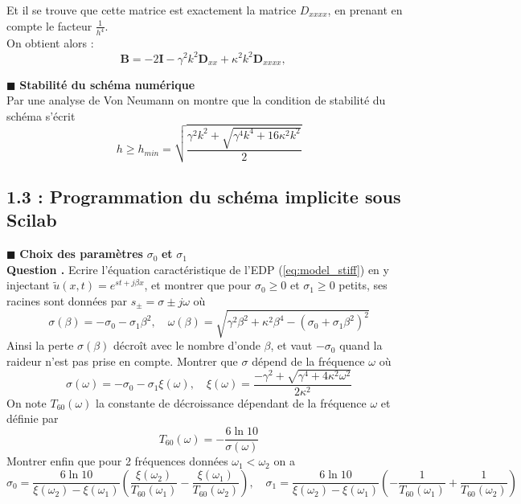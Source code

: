 \documentclass[a4,12pt]{article}
\newcommand{\B}{\mathbf{B}}
\newcommand{\D}{\mathbf{D}}
\newcounter{Nbquestion}
\newcommand*\question{%
\stepcounter{Nbquestion}%
\textbf{Question \theNbquestion. }}
\begin{document}
    Et il se trouve que cette matrice est exactement la matrice $D_{xxxx}$, en prenant en compte le facteur $\frac{1}{h^4}$.\\

  On obtient alors :
  $$ \B=-2\mathbf{I}-\gamma^2 k^2 \D_{xx}+\kappa^2 k^2\D_{xxxx}, \quad $$


  \hspace{0.5cm} $\blacksquare$ \textbf{Stabilité du schéma numérique} \\

  Par une analyse de Von Neumann on montre que la condition de stabilité du schéma s'écrit 
  \[
    h\geqslant h_{min}=\sqrt{\frac{\gamma^2k^2+\sqrt{\gamma^4 k^4+16\kappa^2 k^2}}{2}}
  \]

  \subsection*{1.3 : Programmation du schéma implicite sous Scilab}

  \hspace{0.5cm} $\blacksquare$ \textbf{Choix des paramètres} $\sigma_0$  \textbf{et}  $\sigma_1$\\


  \question Ecrire l'équation caractéristique de l'EDP (\ref{eq:model_stiff}) en y injectant $\tilde u(x,t)=e^{st+j\beta x}$, et montrer que pour $\sigma_0\geqslant 0$ et $\sigma_1\geqslant 0$ petits, ses racines sont données par $s_{\pm}=\sigma\pm j\omega$ où 
  \[
    \sigma(\beta)=-\sigma_0-\sigma_1\beta^2,\quad \omega(\beta)=\sqrt{\gamma^2 \beta^2+\kappa^2\beta^4-(\sigma_0+\sigma_1\beta^2)^2}
  \]
  Ainsi la perte $\sigma(\beta)$ décroît avec le nombre d'onde $\beta$, et vaut $-\sigma_0$ quand la raideur n'est pas prise en compte.  Montrer que $\sigma$ dépend de la fréquence $\omega$ où 
  \[
    \sigma(\omega)=-\sigma_0-\sigma_1\xi (\omega),\quad \xi(\omega)=\frac{-\gamma^2+\sqrt{\gamma^4+4\kappa^2 \omega^2}}{2\kappa^2}
  \]
  On note $T_{60}(\omega)$ la constante de décroissance dépendant de la fréquence $\omega$ et définie par 
  \[
    T_{60}(\omega)=-\frac{6\ln 10}{\sigma(\omega)}
  \]
  Montrer enfin que pour 2 fréquences données $\omega_1<\omega_2$ on a 
  \[
    \sigma_0=\frac{6 \ln 10}{\xi(\omega_2)-\xi(\omega_1)}\left(\frac{\xi(\omega_2)}{T_{60}(\omega_1)}-\frac{\xi(\omega_1)}{T_{60}(\omega_2)}\right), \quad \sigma_1=\frac{6 \ln 10}{\xi(\omega_2)-\xi(\omega_1)}\left(-\frac{1}{T_{60}(\omega_1)}+\frac{1}{T_{60}(\omega_2)}\right)
  \]
\end{document}
